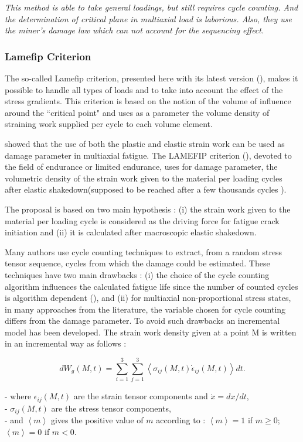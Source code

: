 \textit{This method is able to take general loadings, but still requires cycle counting. And the determination of critical plane in multiaxial load is laborious. Also, they use the miner's damage law which can not account for the sequencing effect.}

\subsubsection{Lamefip Criterion}
The so-called Lamefip criterion, presented here with its latest version (\cite{benabes2006approche}), makes it possible to handle all types of loads and to take into account the effect of the stress gradients. This criterion is based on the notion of the volume of influence around the ``critical point" and uses as a parameter the volume density of straining work supplied per cycle to each volume element.

\cite{ellyin2012fatigue} showed that the use of both the plastic and elastic strain work can be used
as damage parameter in multiaxial fatigue. The LAMEFIP criterion (\cite{banvillet2003volumetric}),
devoted to the field of endurance or limited endurance, uses for damage parameter, the volumetric density of the strain work given to the material per loading cycles after elastic shakedown(supposed to be reached after a few thousands cycles ).

The proposal is based on two main hypothesis : (i) the strain work given to the material per loading cycle is considered as the driving force for fatigue crack initiation and (ii) it is calculated after macroscopic elastic shakedown.

Many authors use cycle counting techniques to extract, from a random stress tensor sequence, cycles from which the damage could be estimated. These techniques have two main drawbacks : (i) the choice of the cycle counting algorithm influences the calculated fatigue life since the number of counted cycles is algorithm dependent (\cite{dowling1983fatigue}), and (ii) for multiaxial non-proportional stress states, in many approaches from the literature, the variable chosen for cycle counting differs from the damage parameter. To avoid such drawbacks an incremental model has been developed. The strain work density given at a point M is written in an incremental way as follows :

$$dW_g(M,t)=\sum_{i=1}^{3}\sum_{j=1}^{3}\left\langle \sigma_{ij}\left( M,t\right)\dot{\epsilon}_{ij}\left( M,t \right)\right\rangle  dt .$$

\noindent
- where $\epsilon_{ij}\left( M,t\right)$ are the strain tensor components and $\dot{x}= dx/dt$,\\
- $\sigma_{ij}\left( M,t\right)$ are the stress tensor components,\\
- and $\left\langle m\right\rangle$ gives the positive value of $m$ according to : $\left\langle m\right\rangle=1$ if $m \geqslant 0$; $\left\langle m\right\rangle=0$  if $m < 0$.

